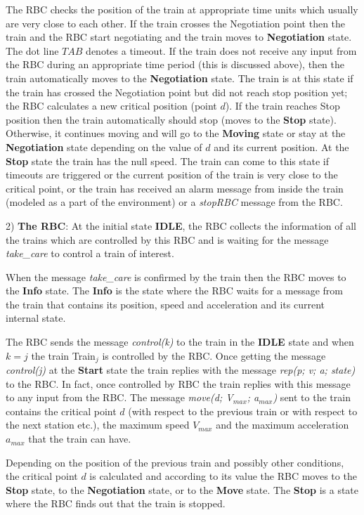 \documentclass{template/openetcs_article}
\begin{document}
The RBC checks the position of the train at appropriate time units which usually are very close to each other. If the train crosses the Negotiation point then the train and the RBC start negotiating and the train moves to \textbf{Negotiation} state. The dot line $TAB$ denotes a timeout. If the train does not receive any input from the RBC during an appropriate time period (this is discussed above), then the train automatically moves to the \textbf{Negotiation} state.  The train is at this state if the train has crossed the Negotiation point but did not reach stop position yet; the RBC calculates a new critical position (point $d$).  If the train reaches Stop position then the train automatically should stop (moves to the \textbf{Stop} state). Otherwise, it continues moving and will go to the \textbf{Moving} state or stay at the \textbf{Negotiation} state depending on the value of $d$ and its current position. At the \textbf{Stop} state the train has the null speed. The train can come to this state if timeouts are triggered or the current position of the train is very close to the critical point, or the train has received an alarm message from inside the train (modeled as a part of the environment) or a \textit{stopRBC} message from the RBC.

2) \textbf{The RBC}: At the initial state \textbf{IDLE}, the RBC collects the information of all the trains which are controlled by this RBC and is waiting for the message \textit{take\_care} to control a train of interest.
 
When the message \textit{take\_care} is confirmed by the train then the RBC moves to the \textbf{Info} state. The \textbf{Info} is the state where the RBC waits for a message from the train that contains its position, speed and acceleration and its current internal state. 

The RBC sends the message \textit{control(k)} to the train in the \textbf{IDLE} state and when $k = j$ the train Train$_j$ is controlled by the RBC. Once getting the message \textit{control(j)} at the \textbf{Start} state the train replies with the message \textit{rep(p; v; a; state)} to the RBC. In fact, once controlled by RBC the train replies with this message to any input from the RBC. The message \textit{move(d; V$_{max}$; a$_{max}$)} sent to the train contains the critical point $d$ (with respect to the previous train or with respect to the next station etc.), the maximum speed $V_{max}$ and the maximum acceleration $a_{max}$ that the train can have. 

Depending on the position of the previous train and possibly other conditions, the critical point $d$ is calculated and according to its value the RBC moves to the \textbf{Stop} state, to the \textbf{Negotiation} state, or to the \textbf{Move} state. The \textbf{Stop} is a state where the RBC finds out that the train is stopped.
\end{document}
